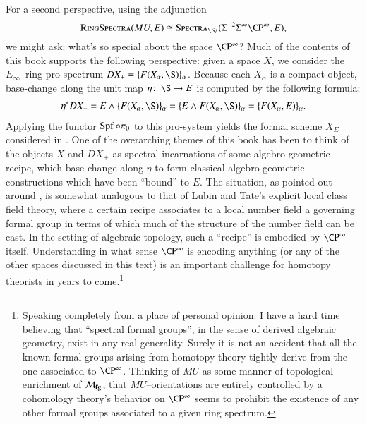 For a second perspective, using the adjunction \[\CatOf{RingSpectra}(MU, E) \cong \CatOf{Spectra}_{\S/}(\Susp^{-2} \Susp^\infty \CP^\infty, E),\] we might ask: what's so special about the space $\CP^\infty$?  Much of the contents of this book supports the following perspective: given a space $X$, we consider the $E_\infty$--ring pro-spectrum $DX_+ = \{F(X_\alpha, \S)\}_\alpha$.  Because each $X_\alpha$ is a compact object, base-change along the unit map $\eta\co \S \to E$ is computed by the following formula:
\begin{align*}
\eta^* DX_+ = E \sm \{F(X_\alpha, \S)\}_\alpha = \{E \sm F(X_\alpha, \S)\}_\alpha = \{F(X_\alpha, E)\}_\alpha.
\end{align*}
Applying the functor $\operatorname{Spf} \circ \pi_0$ to this pro-system yields the formal scheme $X_E$ considered in .  One of the overarching themes of this book has been to think of the objects $X$ and $DX_+$ as spectral incarnations of some algebro-geometric recipe, which base-change along $\eta$ to form classical algebro-geometric constructions which have been ``bound'' to $E$.  The situation, as pointed out around , is somewhat analogous to that of Lubin and Tate's explicit local class field theory, where a certain recipe associates to a local number field a governing formal group in terms of which much of the structure of the number field can be cast.  In the setting of algebraic topology, such a ``recipe'' is embodied by $\CP^\infty$ itself.  Understanding in what sense $\CP^\infty$ is encoding anything (or any of the other spaces discussed in this text) is an important challenge for homotopy theorists in years to come.\footnote{Speaking completely from a place of personal opinion: I have a hard time believing that ``spectral formal groups'', in the sense of derived algebraic geometry, exist in any real generality.  Surely it is not an accident that all the known formal groups arising from homotopy theory tightly derive from the one associated to $\CP^\infty$.  Thinking of $MU$ as some manner of topological enrichment of $\mathcal{M}_{\mathbf{fg}}$, that $MU$--orientations are entirely controlled by a cohomology theory's behavior on $\CP^\infty$ seems to prohibit the existence of any other formal groups associated to a given ring spectrum.}











